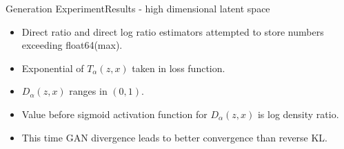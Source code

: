 \documentclass{beamer}
\begin{document}
\begin{frame}{Generation Experiment}{Results - high dimensional latent space}
\begin{table}[h]
\end{table}
\begin{itemize}
\item Direct ratio and direct log ratio estimators attempted to store numbers exceeding float64(max).
\item Exponential of $T_\alpha(z,x)$ taken in loss function.
\item $D_\alpha(z,x)$ ranges in $(0,1)$.
\item Value before sigmoid activation function for $D_\alpha(z,x)$ is log density ratio.
\item This time GAN divergence leads to better convergence than reverse KL.
\end{itemize}
\end{frame}
\end{document}
